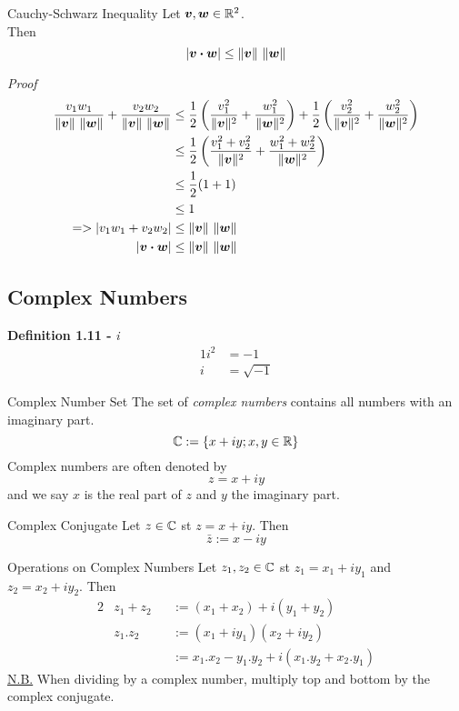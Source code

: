 \documentclass[11pt,a4paper]{article}
\begin{document}
\subtitle{Theorem 1.10 - }{Cauchy-Schwarz Inequality}
Let $\boldsymbol{v}, \boldsymbol{w} \in \mathbb{R}^2$. \\
Then $$|\boldsymbol{v} \boldsymbol{\cdot} \boldsymbol{w}| \leq \|\boldsymbol{v}\|\ \|\boldsymbol{w}\|$$

\textit{Proof}
\begin{align*}
  \frac{v_1w_1}{\|\boldsymbol{v}\|\ \|\boldsymbol{w}\|} + \frac{v_2w_2}{\|\boldsymbol{v}\|\ \|\boldsymbol{w}\|} &\leq \frac{1}{2}\left(\frac{v_{1}^{2}}{\|\boldsymbol{v}\|^2} + \frac{w_{1}^{2}}{\|\boldsymbol{w}\|^2}\right) + \frac{1}{2}\left(\frac{v_{2}^{2}}{\|\boldsymbol{v}\|^2} + \frac{w_{2}^{2}}{\|\boldsymbol{w}\|^2}\right) \\
  &\leq \frac{1}{2}\left(\frac{v_{1}^{2} + v_{2}^{2}}{\|\boldsymbol{v}\|^2} + \frac{w_{1}^{2} + w_{2}^{2}}{\|\boldsymbol{w}\|^2}\right) \\
  &\leq \frac{1}{2}(1 + 1) \\
  &\leq 1 \\
  => |v_1w_1 + v_2w_2| &\leq \|\boldsymbol{v}\|\ \|\boldsymbol{w}\| \\
  |\boldsymbol{v} \boldsymbol{\cdot} \boldsymbol{w}| &\leq \|\boldsymbol{v}\|\ \|\boldsymbol{w}\| \\
\end{align*}

\subsection{Complex Numbers}

\textbf{Definition 1.11 - }\textit{i}
\begin{alignat*}{1}
  i^2 &= -1 \\
  i &= \sqrt{-1}
\end{alignat*}

\subtitle{Definition 1.12 - }{Complex Number Set}
The set of \textit{complex numbers} contains all numbers with an imaginary part. $$\mathbb{C} := \left\{x + iy; x,y \in \mathbb{R}\right\}$$
Complex numbers are often denoted by $$z = x + iy$$ and we say $x$ is the real part of $z$ and $y$ the imaginary part.

\subtitle{Definition 1.13 - }{Complex Conjugate}
Let $z \in \mathbb{C}$ st $z = x + iy$. Then
$$\bar{z} := x - iy$$

\subtitle{Theorem 1.14 - }{Operations on Complex Numbers}
Let $z_1,z_2 \in \mathbb{C}$ st $z_1 = x_1 + iy_1$ and $z_2 = x_2 + iy_2$. Then
\begin{alignat*}{2}
  &z_1 + z_2 &&:= (x_1 + x_2) + i(y_1 + y_2) \\
  &z_1.z_2 &&:= (x_1 + iy_1)(x_2 + iy_2) \\
  & && := x_1.x_2 - y_1.y_2 + i(x_1.y_2 + x_2.y_1)
\end{alignat*}
\underline{N.B.} When dividing by a complex number, multiply top and bottom by the complex conjugate. \\
\end{document}
